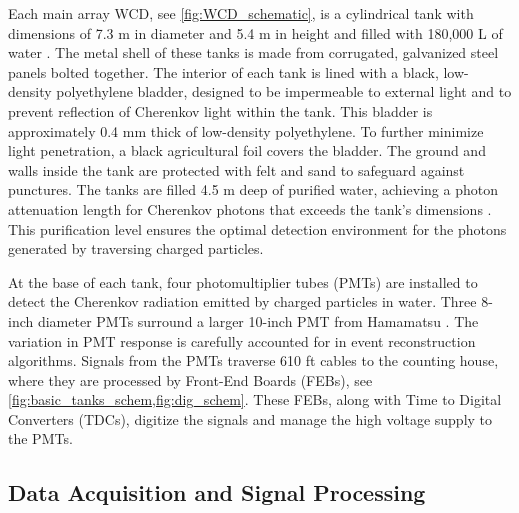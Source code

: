 Each main array WCD, see \cref{fig:WCD_schematic}, is a cylindrical tank with dimensions of 7.3 m in diameter and 5.4 m in height and filled with 180,000 L of water \cite{HAWC_NIM}.
The metal shell of these tanks is made from corrugated, galvanized steel panels bolted together.
The interior of each tank is lined with a black, low-density polyethylene bladder, designed to be impermeable to external light and to prevent reflection of Cherenkov light within the tank.
This bladder is approximately 0.4 mm thick of low-density polyethylene.
To further minimize light penetration, a black agricultural foil covers the bladder.
The ground and walls inside the tank are protected with felt and sand to safeguard against punctures.
The tanks are filled 4.5 m deep of purified water, achieving a photon attenuation length for Cherenkov photons that exceeds the tank's dimensions \cite{HAWC_NIM}.
This purification level ensures the optimal detection environment for the photons generated by traversing charged particles.

At the base of each tank, four photomultiplier tubes (PMTs) are installed to detect the Cherenkov radiation emitted by charged particles in water.
Three 8-inch diameter PMTs surround a larger 10-inch PMT from Hamamatsu \cite{hawc_pmt}.
The variation in PMT response is carefully accounted for in event reconstruction algorithms.
Signals from the PMTs traverse 610 ft cables to the counting house, where they are processed by Front-End Boards (FEBs), see \cref{fig:basic_tanks_schem,fig:dig_schem}.
These FEBs, along with Time to Digital Converters (TDCs), digitize the signals and manage the high voltage supply to the PMTs.

\subsection{Data Acquisition and Signal Processing} \label{sec:hawc_daq}

